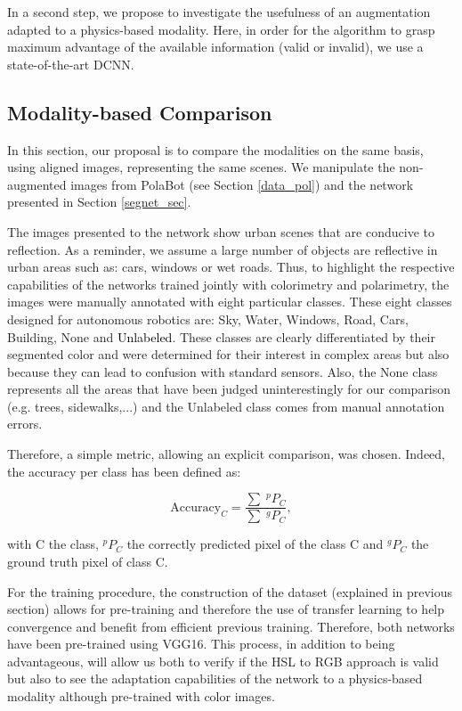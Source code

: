 In a second step, we propose to investigate the usefulness of an augmentation adapted to a physics-based modality. Here, in order for the algorithm to grasp maximum advantage of the available information (valid or invalid), we use a state-of-the-art DCNN. 

\subsection{Modality-based Comparison}

In this section, our proposal is to compare the modalities on the same basis, using aligned images, representing the same scenes.
We manipulate the non-augmented images from PolaBot (see Section \ref{data_pol}) and the network presented in Section \ref{segnet_sec}.

The images presented to the network show urban scenes that are conducive to reflection. As a reminder, we assume a large number of objects are reflective in urban areas such as: cars, windows or wet roads.
Thus, to highlight the respective capabilities of the networks trained jointly with colorimetry and polarimetry, the images were manually annotated with eight particular classes.
These eight classes designed for autonomous robotics are: \textcolor{sky}{Sky}, \textcolor{water}{Water}, \textcolor{windows}{Windows}, \textcolor{road}{Road}, \textcolor{car}{Cars}, \textcolor{buildings}{Building}, \textcolor{none}{None} and \textcolor{black}{Unlabeled}. These classes are clearly differentiated by their segmented color and were determined for their interest in complex areas but also because they can lead to confusion with standard sensors. Also, the None class represents all the areas that have been judged uninterestingly for our comparison (e.g. trees, sidewalks,...) and the Unlabeled class comes from manual annotation errors.


Therefore, a simple metric, allowing an explicit comparison, was chosen. Indeed, the accuracy per class has been defined as:


\begin{equation}
\textrm{Accuracy}_C = \frac{\sum \; ^pP_C}{\sum \; ^gP_C},
\end{equation}

with C the class, $^pP_C$ the correctly predicted pixel of the class C and $^gP_C$ the ground truth pixel of class C.

For the training procedure, the construction of the dataset (explained in previous section) allows for pre-training and therefore the use of transfer learning\cite{torrey2010transfer,pan2009survey} to help convergence and benefit from efficient previous training. Therefore, both networks have been pre-trained using VGG16. 
This process, in addition to being advantageous, will allow us both to verify if the HSL to RGB approach is valid but also to see the adaptation capabilities of the network to a physics-based modality although pre-trained with color images.

